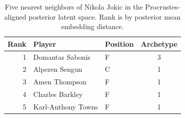 \begin{table}[htbp]
  \centering\small
  \begin{tabular}{rllc}
    \toprule
    Rank & Player & Position & Archetype \\
    \midrule
    1 & Domantas Sabonis & F & 3 \\
    2 & Alperen Sengun & C & 1 \\
    3 & Amen Thompson & F & 1 \\
    4 & Charles Barkley & F & 1 \\
    5 & Karl-Anthony Towns & F & 1 \\
    \bottomrule
  \end{tabular}
  \caption{Five nearest neighbors of Nikola Jokic in the Procrustes-aligned posterior latent space. Rank is by posterior mean embedding distance.}
  \label{tab:Nikola_Jokic_neighbors}
\end{table}

